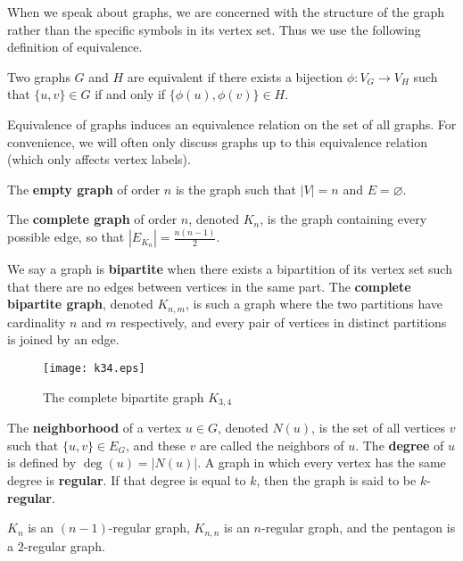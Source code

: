 When we speak about graphs, we are concerned with the structure of the graph
rather than the specific symbols in its vertex set. Thus we use the following
definition of equivalence.

\begin{definition}
  Two graphs $G$ and $H$ are equivalent if there exists a bijection $\phi : V_G \to V_H$
  such that $\{u,v\} \in G$ if and only if $\{\phi(u),\phi(v)\} \in H$.
\end{definition}

Equivalence of graphs induces an equivalence relation on the set of all graphs. For convenience, we
will often only discuss graphs up to this equivalence relation (which only affects vertex labels).

\begin{example}
  \label{ex:basic_graphs}
  The \textbf{empty graph} of order $n$ is the graph such that $|V| = n$ and $E
  = \varnothing$.

  The \textbf{complete graph} of order $n$, denoted $K_n$, is the graph containing every possible
  edge, so that $|E_{K_n}| = \frac{n(n-1)}{2}$.

  We say a graph is \textbf{bipartite} when there exists a bipartition of its vertex set such that
  there are no edges between vertices in the same part. The \textbf{complete bipartite graph},
  denoted $K_{n,m}$, is such a graph where the two partitions have cardinality $n$ and $m$
  respectively, and every pair of vertices in distinct partitions is joined by an edge.
\end{example}

\begin{figure}[H]
  \centering
  \texttt{[image: k34.eps]}
  \caption{The complete bipartite graph $K_{3,4}$}
  \label{fig:k34}
\end{figure}

\begin{definition}
  The \textbf{neighborhood} of a vertex $u \in G$, denoted $N(u)$, is the set of all vertices $v$
  such that $\{u,v\} \in E_G$, and these $v$ are called the neighbors of $u$. The \textbf{degree} of
  $u$ is defined by $\deg(u) = |N(u)|$. A graph in which every vertex has the same degree is
  \textbf{regular}. If that degree is equal to $k$, then the graph is said to be $k$-\textbf{regular}.
\end{definition}

\begin{example}
  $K_n$ is an $(n-1)$-regular graph, $K_{n,n}$ is an $n$-regular graph, and the pentagon is a
  $2$-regular graph.
\end{example}

